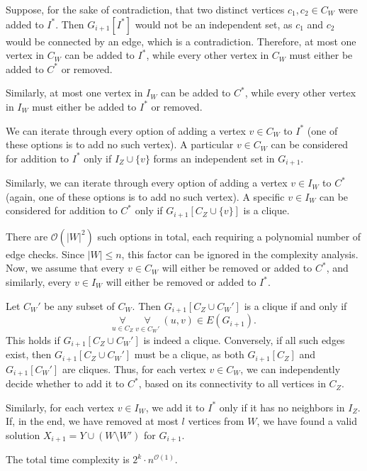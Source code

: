 \documentclass[12pt]{article}
\begin{document}
	Suppose, for the sake of contradiction, that two distinct vertices \(c_{1},
	c_{2} \in C_{W}\) were added to \(I^{\ast}\). Then \(G_{i + 1}[I^{\ast}]\)
	would not be an independent set, as \(c_{1}\) and \(c_{2}\) would be
	connected by an edge, which is a contradiction. Therefore, at most one
	vertex in \(C_{W}\) can be added to \(I^{\ast}\), while every other vertex
	in \(C_{W}\) must either be added to \(C^{\ast}\) or removed.
	
	\medskip
	
	Similarly, at most one vertex in \(I_{W}\) can be added to \(C^{\ast}\),
	while every other vertex in \(I_{W}\) must either be added to \(I^{\ast}\)
	or removed.
	
	\medskip
	
	We can iterate through every option of adding a vertex \(v \in C_{W}\) to
	\(I^{\ast}\) (one of these options is to add no such vertex). A particular
	\(v \in C_{W}\) can be considered for addition to \(I^{\ast}\) only if
	\(I_{Z} \cup \{v\}\) forms an independent set in \(G_{i + 1}\).
	
	\medskip
	
	Similarly, we can iterate through every option of adding a vertex \(v \in
	I_{W}\) to \(C^{\ast}\) (again, one of these options is to add no such
	vertex). A specific \(v \in I_{W}\) can be considered for addition to
	\(C^{\ast}\) only if \(G_{i + 1}[C_{Z} \cup \{v\}]\) is a clique.
	
	\medskip
	
	There are \(\mathcal{O}(|W|^{2})\) such options in total, each requiring a
	polynomial number of edge checks. Since \(|W| \leqslant n\), this factor can
	be ignored in the complexity analysis. Now, we assume that every \(v \in
	C_{W}\) will either be removed or added to \(C^{\ast}\), and similarly,
	every \(v \in I_{W}\) will either be removed or added to \(I^{\ast}\).
	
	\medskip
	
	Let \(C_{W}'\) be any subset of \(C_{W}\). Then \(G_{i + 1}[C_{Z} \cup
	C_{W}']\) is a clique if and only if
	\[ \underset{u \in C_{Z}}{\forall} \ \underset{v \in C_{W}'}{\forall} \
	(u, v) \in E(G_{i + 1}) \text{.} \]
	This holds if \(G_{i + 1}[C_{Z} \cup C_{W}']\) is indeed a clique.
	Conversely, if all such edges exist, then \(G_{i + 1}[C_{Z} \cup C_{W}']\)
	must be a clique, as both \(G_{i + 1}[C_{Z}]\) and \(G_{i + 1}[C_{W}']\) are
	cliques. Thus, for each vertex \(v \in C_{W}\), we can independently decide
	whether to add it to \(C^{\ast}\), based on its connectivity to all vertices
	in \(C_{Z}\).
	
	\medskip
	
	Similarly, for each vertex \(v \in I_{W}\), we add it to \(I^{\ast}\) only
	if it has no neighbors in \(I_{Z}\). If, in the end, we have removed at most
	\(l\) vertices from \(W\), we have found a valid solution \(X_{i + 1} = Y
	\cup (W \setminus W')\) for \(G_{i + 1}\).
	
	\medskip
	
	The total time complexity is \(2^{k} \cdot n^{\mathcal{O}(1)}\).
\end{document}
